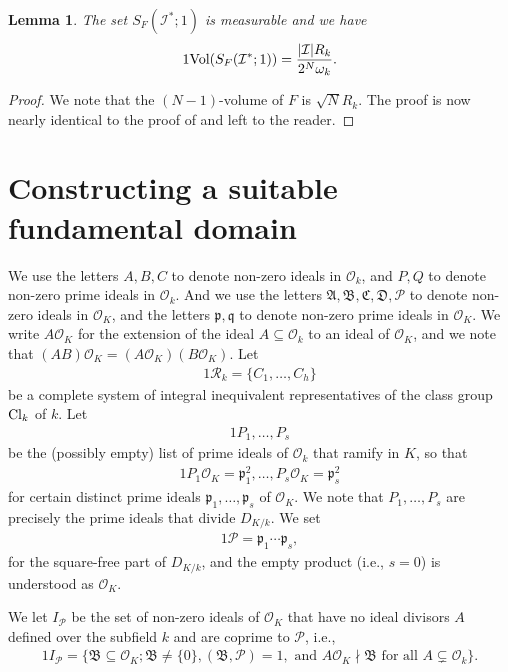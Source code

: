\documentclass[11pt]{amsart}
\newtheorem{lemma}{Lemma}[section]
\numberwithin{equation}{eqncounter}
\def\Pc{\mathcal{P}}
\def\I{\mathcal{I}}
\def\R{\mathcal{R}}
\def\p{\mathfrak{p}}
\def\q{\mathfrak{q}}
\def\B{\mathfrak{B}}
\def\A{\mathfrak{A}}
\def\C{\mathfrak{C}}
\def\D{\mathfrak{D}}
\def\Cl{\mathop{\rm Cl}\nolimits}
\def\Vol{\textup{Vol}}
\def\Oseen{{\mathcal{O}}}
\def\dis{D_{K/k}}
\begin{document}
\begin{lemma}\label{lem: volume}
The set $S_F(\I^*;1)$ is measurable and we have
\begin{alignat*}1
\Vol(S_F(\I^*;1))=\frac{|\I| R_k}{2^{N}\omega_k}.
\end{alignat*}
\end{lemma}
\begin{proof}
We note that the $(N-1)$-volume of $F$ is $\sqrt{N}R_k$.
The proof is now nearly identical to the proof of \cite[Lemma 4]{MasserVaaler2} and left to the reader.
\end{proof}






\section{Constructing a suitable fundamental domain}\label{sec: funddom}

We use the letters $A,B,C$ to denote non-zero ideals in $\Oseen_k$,  and $P,Q$ to denote  non-zero prime ideals in $\Oseen_k$.
And we use the letters $\A,\B,\C,\D,\Pc$  to denote non-zero  ideals in $\Oseen_K$, and the letters $\p,\q$ to denote non-zero  prime ideals in $\Oseen_K$.
We write $A\Oseen_K$ for the extension of the ideal $A\subseteq \Oseen_k$ to an ideal of $\Oseen_K$, and we note that $(AB)\Oseen_K=(A\Oseen_K)(B\Oseen_K)$.
Let 
\begin{alignat*}1
\R_k=\{C_1,\ldots,C_h\} 
\end{alignat*}
be a complete system of integral inequivalent representatives of the class group $\Cl_k$ of $k$.
Let 
\begin{alignat*}1
P_1, \ldots, P_s
\end{alignat*}
be the (possibly empty) list of prime ideals of $\Oseen_k$ that ramify in $K$, so that
\begin{alignat*}1
P_1\Oseen_K=\p_1^2, \ldots, P_s\Oseen_K=\p_s^2
\end{alignat*}
for certain distinct prime ideals $\p_1,\ldots,\p_s$ of $\Oseen_K$. 
We note that $P_1,\ldots, P_s$ are precisely the prime ideals that divide $\dis$.
We set
\begin{alignat*}1
\Pc=\p_1\cdots \p_s,
\end{alignat*}
for the square-free part of $\dis$,
and the empty product (i.e., $s=0$) is understood as $\Oseen_K$.




We let $I_\Pc$ be the set of  non-zero ideals of $\Oseen_K$ that have no ideal divisors $A$ defined over the subfield $k$ and are coprime to $\Pc$, i.e., 
\begin{alignat*}1
I_\Pc=\{\B\subseteq \Oseen_K; \B\neq \{0\}, (\B,\Pc)=1, \text{ and } A\Oseen_K\nmid \B \text{ for all }A\subsetneq \Oseen_k\}.
\end{alignat*}
\end{document}
